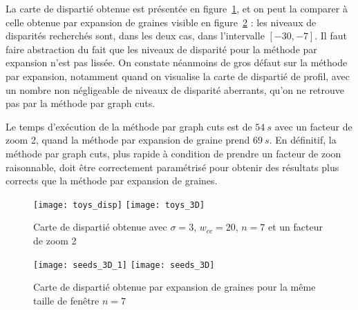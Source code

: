 \documentclass[12pt,a4paper,onecolumn]{article}
\begin{document}
La carte de dispartié obtenue est présentée en figure~\ref{fig_toys_3D}, et on peut la comparer à celle obtenue par expansion de graines visible en figure~\ref{fig_seeds_3D} : les niveaux de disparités recherchés sont, dans les deux cas, dans l'intervalle \([-30, -7]\). Il faut faire abstraction du fait que les niveaux de disparité pour la méthode par expansion n'est pas lissée. On constate néanmoins de gros défaut sur la méthode par expansion, notamment quand on visualise la carte de dispartié de profil, avec un nombre non négligeable de niveaux de disparité aberrants, qu'on ne retrouve pas par la méthode par graph cuts.

Le temps d'exécution de la méthode par graph cuts est de \(54~s\) avec un facteur de zoom 2, quand la méthode par expansion de graine prend \(69~s\). En définitif, la méthode par graph cuts, plus rapide à condition de prendre un facteur de zoon raisonnable, doit être correctement paramétrisé pour obtenir des résultats plus corrects que la méthode par expansion de graines.

\begin{figure}[H]
	\centering
	\texttt{[image: toys\_disp]}
	\texttt{[image: toys\_3D]}
	\caption{Carte de dispartié obtenue avec \(\sigma = 3\), \(w_{cc} = 20\), \(n = 7\) et un facteur de zoom 2}
	\label{fig_toys_3D}
\end{figure}


\begin{figure}[H]
	\centering
	\texttt{[image: seeds\_3D\_1]}
	\texttt{[image: seeds\_3D]}
	\caption{Carte de dispartié obtenue par expansion de graines pour la même taille de fenêtre \(n = 7\)}
	\label{fig_seeds_3D}
\end{figure}
\end{document}
